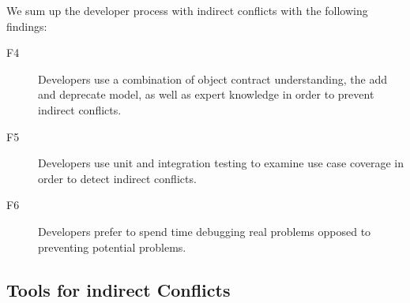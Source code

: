 \documentclass[conference]{IEEEtran}
\makeatletter
\def\namedlabel#1#2{\begingroup
   \def\@currentlabel{#2}%
   \label{#1}\endgroup
}
\makeatother
\begin{document}
We sum up the developer process with indirect conflicts with the following findings:
\begin{description}
	\item[F4\namedlabel{itm:f4}{F4}] Developers use a combination of object contract understanding, the add and deprecate model, as well as expert 
																	 knowledge in order to prevent indirect conflicts.
	\item[F5\namedlabel{itm:f5}{F5}] Developers use unit and integration testing to examine use case coverage in order to detect indirect conflicts.
	\item[F6\namedlabel{itm:f6}{F6}] Developers prefer to spend time debugging real problems opposed to preventing potential problems.
\end{description}

\subsection{Tools for indirect Conflicts}
\label{sec:td}
\end{document}
